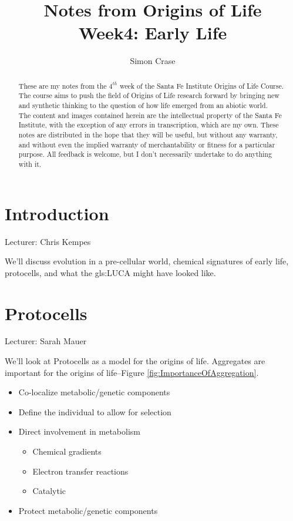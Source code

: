 \documentclass[]{article}
\title{Notes from Origins of Life\\Week4: Early Life}
\author{Simon Crase}
\begin{document}
\maketitle

\begin{abstract}
   These are my notes from the $4^{th}$ week of the Santa Fe Institute Origins of Life Course\cite{sfi2019}. The course aims to push the field of Origins of Life research forward by bringing new and synthetic thinking to the question of how life emerged from an abiotic world.\\
   The content and images contained herein are the intellectual property of the Santa Fe Institute, with the exception of any errors in transcription, which are my own.
   These notes are distributed in the hope that they will be useful,
   but without any warranty, and without even the implied warranty of
   merchantability or fitness for a particular purpose. All feedback is welcome,
   but I don't necessarily undertake to do anything with it.
\end{abstract}

\setcounter{tocdepth}{2}
\tableofcontents
\listoffigures
\section{Introduction}

Lecturer: Chris Kempes


We'll discuss evolution in a pre-cellular world, chemical signatures of early life, protocells, and what the \gls{gls:LUCA} might have looked like.

\section{Protocells}

Lecturer: Sarah Mauer

We'll look at Protocells as a model for the origins of life. Aggregates are important for the origins of life--Figure \ref{fig:ImportanceOfAggregation}.

\begin{itemize}
	\item  Co-localize metabolic/genetic components
	\item   Define the individual to allow for 	selection
	\item   Direct involvement in metabolism
	\begin{itemize}
		\item 	Chemical gradients
		\item   Electron transfer reactions
		\item   Catalytic
	\end{itemize}
	\item   Protect metabolic/genetic 	components
\end{itemize}
\end{document}
